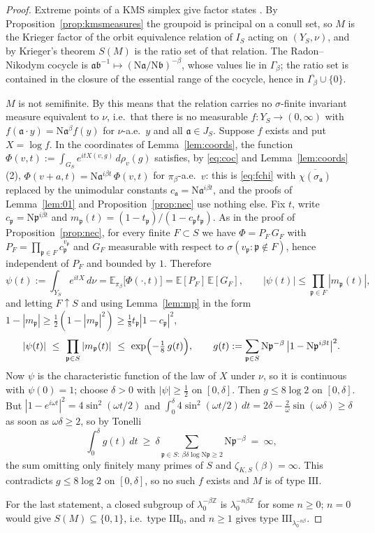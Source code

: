 \documentclass[11pt]{amsart}
\numberwithin{equation}{section}
\theoremstyle{definition}
\theoremstyle{remark}
\newcommand{\Z}{\mathbb{Z}}
\newcommand{\Ns}{\mathrm{N}}
\newcommand{\pp}{\mathfrak{p}}
\newcommand{\aaa}{\mathfrak{a}}
\newcommand{\bb}{\mathfrak{b}}
\begin{document}
\begin{proof}
Extreme points of a KMS simplex give factor states \cite[\S5.3]{BR}. By
Proposition~\ref{prop:kmsmeasures} the groupoid is principal on a conull set, so $M$ is
the Krieger factor of the orbit equivalence relation of $I_S$ acting on $(Y_S,\nu)$, and by
Krieger's theorem \cite{Krieger} $S(M)$ is the ratio set of that relation. The Radon--Nikodym cocycle is
$\aaa\bb^{-1}\mapsto(\Ns\aaa/\Ns\bb)^{-\beta}$, whose values lie in $\Gamma_\beta$; the
ratio set is contained in the closure of the essential range of the cocycle, hence in
$\overline{\Gamma_\beta}\cup\{0\}$.

$M$ is not semifinite. By \cite{Krieger} this means that the relation carries no
$\sigma$-finite invariant measure equivalent to $\nu$, i.e.\ that there is no measurable
$f:Y_S\to(0,\infty)$ with $f(\aaa\cdot y)=\Ns\aaa^{\beta}f(y)$ for $\nu$-a.e.\ $y$ and all
$\aaa\in J_S$. Suppose $f$ exists and put $X=\log f$. In the coordinates of
Lemma~\ref{lem:coords}, the function
$\Phi(v,t):=\int_{G_S}e^{itX(v,g)}\,d\rho_v(g)$ satisfies, by \eqref{eq:coc} and
Lemma~\ref{lem:coords}(2), $\Phi(v+a,t)=\Ns\aaa^{i\beta t}\,\Phi(v,t)$ for $\pi_\beta$-a.e.\ $v$:
this is \eqref{eq:fchi} with $\overline{\chi(\sigma_\aaa)}$ replaced by the unimodular
constants $c_\aaa=\Ns\aaa^{i\beta t}$, and the proofs of Lemma~\ref{lem:01} and
Proposition~\ref{prop:nec} use nothing else. Fix $t$, write $c_\pp=\Ns\pp^{i\beta t}$ and
$m_\pp(t)=(1-t_\pp)/(1-c_\pp t_\pp)$. As in the proof of Proposition~\ref{prop:nec}, for
every finite $F\subset S$ we have $\Phi=P_F\,G_F$ with $P_F=\prod_{\pp\in F}c_\pp^{v_\pp}$ and
$G_F$ measurable with respect to $\sigma(v_\pp:\pp\notin F)$, hence independent of $P_F$ and
bounded by $1$. Therefore
\[
\psi(t):=\int_{Y_S}e^{itX}\,d\nu=\mathbb{E}_{\pi_\beta}\bigl[\Phi(\cdot,t)\bigr]=\mathbb{E}[P_F]\,\mathbb{E}[G_F],
\qquad |\psi(t)|\le\prod_{\pp\in F}|m_\pp(t)|,
\]
and letting $F\uparrow S$ and using Lemma~\ref{lem:mp} in the form
$1-|m_\pp|\ge\frac12(1-|m_\pp|^2)\ge\frac18t_\pp|1-c_\pp|^2$,
\[
|\psi(t)|\ \le\ \prod_{\pp\in S}|m_\pp(t)|\ \le\ \exp\Bigl(-\tfrac18\,g(t)\Bigr),\qquad
g(t):=\sum_{\pp\in S}\Ns\pp^{-\beta}\,\bigl|1-\Ns\pp^{i\beta t}\bigr|^2 .
\]
Now $\psi$ is the characteristic function of the law of $X$ under $\nu$, so it is continuous
with $\psi(0)=1$; choose $\delta>0$ with $|\psi|\ge\frac12$ on $[0,\delta]$. Then
$g\le8\log2$ on $[0,\delta]$. But $|1-e^{i\omega t}|^2=4\sin^2(\omega t/2)$ and
$\int_0^\delta4\sin^2(\omega t/2)\,dt=2\delta-\frac2\omega\sin(\omega\delta)\ge\delta$ as
soon as $\omega\delta\ge2$, so by Tonelli
\[
\int_0^\delta g(t)\,dt\ \ge\ \delta\sum_{\pp\in S:\ \beta\delta\log\Ns\pp\ge2}\Ns\pp^{-\beta}
\ =\ \infty,
\]
the sum omitting only finitely many primes of $S$ and $\zeta_{K,S}(\beta)=\infty$. This
contradicts $g\le8\log2$ on $[0,\delta]$, so no such $f$ exists and $M$ is of type
$\mathrm{III}$.

For the last statement, a closed subgroup of $\lambda_0^{-\beta\Z}$ is $\lambda_0^{-n\beta\Z}$
for some $n\ge0$; $n=0$ would give $S(M)\subseteq\{0,1\}$, i.e.\ type $\mathrm{III}_0$, and
$n\ge1$ gives type $\mathrm{III}_{\lambda_0^{-n\beta}}$.
\end{proof}
\end{document}
